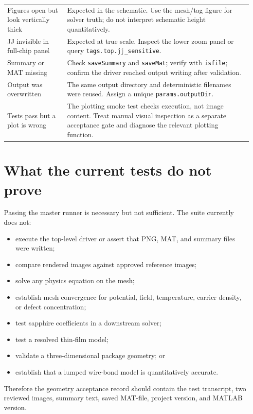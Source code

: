 \documentclass[11pt]{article}
\begin{document}
\begin{longtable}{>{\RaggedRight\arraybackslash}p{} >{\RaggedRight\arraybackslash}p{}}
Figures open but look vertically thick & Expected in the schematic. Use the mesh/tag figure for solver truth; do not interpret schematic height quantitatively. \\
JJ invisible in full-chip panel & Expected at true scale. Inspect the lower zoom panel or query \texttt{tags.top.jj\_sensitive}. \\
Summary or MAT missing & Check \texttt{saveSummary} and \texttt{saveMat}; verify with \texttt{isfile}; confirm the driver reached output writing after validation. \\
Output was overwritten & The same output directory and deterministic filenames were reused. Assign a unique \texttt{params.outputDir}. \\
Tests pass but a plot is wrong & The plotting smoke test checks execution, not image content. Treat manual visual inspection as a separate acceptance gate and diagnose the relevant plotting function. \\
\bottomrule
\end{longtable}

\section{What the current tests do not prove}

Passing the master runner is necessary but not sufficient. The suite currently does not:

\begin{itemize}[leftmargin=*]
  \item execute the top-level driver or assert that PNG, MAT, and summary files were written;
  \item compare rendered images against approved reference images;
  \item solve any physics equation on the mesh;
  \item establish mesh convergence for potential, field, temperature, carrier density, or defect concentration;
  \item test sapphire coefficients in a downstream solver;
  \item test a resolved thin-film model;
  \item validate a three-dimensional package geometry; or
  \item establish that a lumped wire-bond model is quantitatively accurate.
\end{itemize}

Therefore the geometry acceptance record should contain the test transcript, two reviewed images, summary text, saved MAT-file, project version, and MATLAB version.
\end{document}
